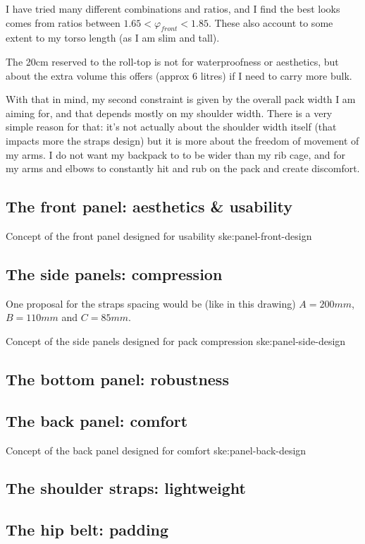 I have tried many different combinations and ratios, and I find the best looks comes from ratios between $1.65 < \varphi_{front} < 1.85$. These also account to some extent to my torso length (as I am slim and tall).

\begin{note}
  The 20cm reserved to the roll-top is not for waterproofness or aesthetics, but about the extra volume this offers (approx 6 litres) if I need to carry more bulk.
\end{note}

With that in mind, my second constraint is given by the overall pack width I am aiming for, and that depends mostly on my shoulder width. There is a very simple reason for that: it's not actually about the shoulder width itself (that impacts more the straps design) but it is more about the freedom of movement of my arms. I do not want my backpack to to be wider than my rib cage, and for my arms and elbows to constantly hit and rub on the pack and create discomfort.

\subsection{The front panel: aesthetics \& usability}

{Concept of the front panel designed for usability}
{ske:panel-front-design}

\subsection{The side panels: compression}

One proposal for the straps spacing would be (like in this drawing) $A=200mm$, $B=110mm$ and $C=85mm$.

{Concept of the side panels designed for pack compression}
{ske:panel-side-design}

\subsection{The bottom panel: robustness}
\subsection{The back panel: comfort}

{Concept of the back panel designed for comfort}
{ske:panel-back-design}

\subsection{The shoulder straps: lightweight}
\subsection{The hip belt: padding}
